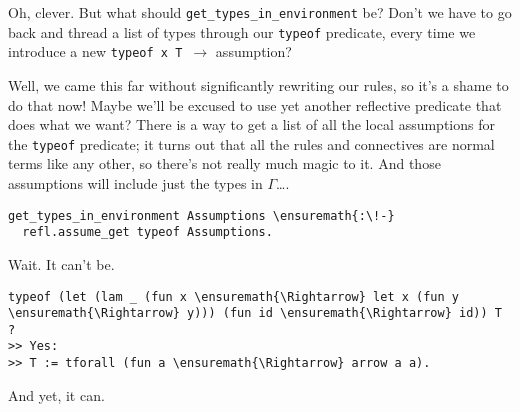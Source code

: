 \identDialog

\heroSTUDENT{} Oh, clever. But what should
\texttt{get\_types\_in\_environment} be? Don't we have to go back and
thread a list of types through our \texttt{typeof} predicate, every time
we introduce a new \texttt{typeof\ x\ T\ \ensuremath{\to}} assumption?

\heroADVISOR{} Well, we came this far without significantly rewriting our
rules, so it's a shame to do that now! Maybe we'll be excused to use yet
another reflective predicate that does what we want? There is a way to
get a list of all the local assumptions for the \texttt{typeof}
predicate; it turns out that all the rules and connectives are normal
\lamprolog terms like any other, so there's not really much magic to it.
And those assumptions will include just the types in \(\Gamma\)\ldots{}.

\begin{verbatim}
get_types_in_environment Assumptions \ensuremath{:\!-}
  refl.assume_get typeof Assumptions.
\end{verbatim}

\heroSTUDENT{} Wait. It can't be.

\begin{verbatim}
typeof (let (lam _ (fun x \ensuremath{\Rightarrow} let x (fun y \ensuremath{\Rightarrow} y))) (fun id \ensuremath{\Rightarrow} id)) T ?
>> Yes:
>> T := tforall (fun a \ensuremath{\Rightarrow} arrow a a).
\end{verbatim}

\heroADVISOR{} And yet, it can.
